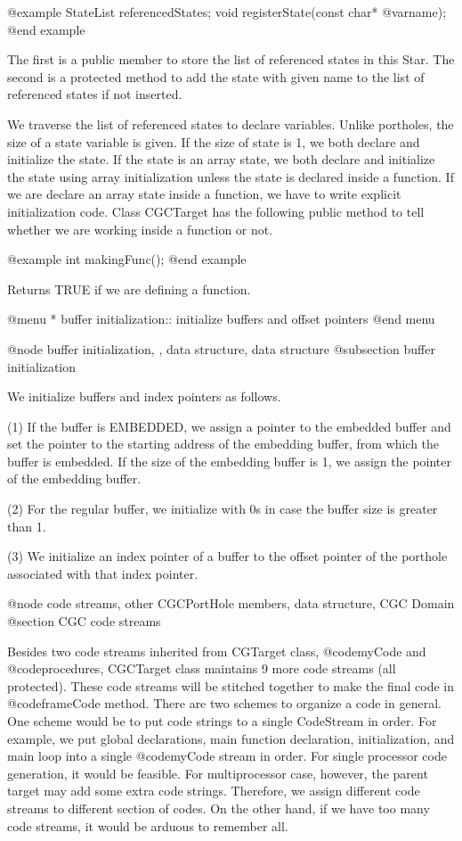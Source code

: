 {@example
StateList referencedStates;
void registerState(const char* @var{name});
@end example

The first is a public member to store the list of referenced states in this
Star. The second is a protected method to add the state with given name to
the list of referenced states if not inserted.

We traverse the list of referenced states to declare variables. Unlike
portholes, the size of a state variable is given. If the size of state is 1,
we both declare and initialize the state. If the state is an array state,
we both declare and initialize the state using array initialization unless
the state is declared inside a function. If we are declare an array state
inside a function, we have to write explicit initialization code.
Class CGCTarget has the following public method to tell whether we are
working inside a function or not.

@example
int makingFunc();
@end example

Returns TRUE if we are defining a function.

@menu
* buffer initialization::		initialize buffers and offset pointers
@end menu

@node buffer initialization, , data structure, data structure
@subsection buffer initialization

We initialize buffers and index pointers as follows.

(1) If the buffer is EMBEDDED, we assign a pointer to the embedded 
buffer and set the pointer
to the starting address of the embedding buffer, from which the buffer
is embedded. If the size of the embedding
buffer is 1, we assign the pointer of the embedding buffer.

(2) For the regular buffer, we initialize with 0s in case the buffer size is
greater than 1.

(3) We initialize an index pointer of a buffer to the offset pointer of
the porthole associated with that index pointer.

@node code streams, other CGCPortHole members, data structure, CGC Domain
@section CGC code streams

Besides two code streams inherited from CGTarget class, @code{myCode} and
@code{procedures}, CGCTarget class maintains 9 more code streams (all
protected). These
code streams will be stitched together to make the final code in
@code{frameCode} method. There are two schemes to organize a code in general.
One scheme would be to put code strings to a single CodeStream in order.
For example, we put global declarations, main function declaration, 
initialization, and main loop into a single @code{myCode} stream in order.
For single processor code generation, it would be feasible. For
multiprocessor case, however, the parent target may add some extra code
strings. Therefore, we assign different code streams to different
section of codes. On the other hand, if we have too many code streams,
it would be arduous to remember all. 

}
